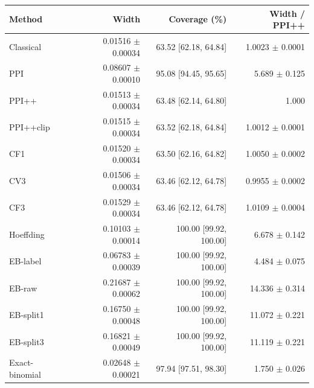 \small
\begin{tabular}{lrrr}
\toprule
Method & Width & Coverage (\%) & Width / PPI++ \\
\midrule
Classical & 0.01516 $\pm$ 0.00034 & 63.52 [62.18, 64.84] & 1.0023 $\pm$ 0.0001 \\
PPI & 0.08607 $\pm$ 0.00010 & 95.08 [94.45, 95.65] & 5.689 $\pm$ 0.125 \\
PPI++ & 0.01513 $\pm$ 0.00034 & 63.48 [62.14, 64.80] & 1.000 \\
PPI++clip & 0.01515 $\pm$ 0.00034 & 63.52 [62.18, 64.84] & 1.0012 $\pm$ 0.0001 \\
CF1 & 0.01520 $\pm$ 0.00034 & 63.50 [62.16, 64.82] & 1.0050 $\pm$ 0.0002 \\
CV3 & 0.01506 $\pm$ 0.00034 & 63.46 [62.12, 64.78] & 0.9955 $\pm$ 0.0002 \\
CF3 & 0.01529 $\pm$ 0.00034 & 63.46 [62.12, 64.78] & 1.0109 $\pm$ 0.0004 \\
Hoeffding & 0.10103 $\pm$ 0.00014 & 100.00 [99.92, 100.00] & 6.678 $\pm$ 0.142 \\
EB-label & 0.06783 $\pm$ 0.00039 & 100.00 [99.92, 100.00] & 4.484 $\pm$ 0.075 \\
EB-raw & 0.21687 $\pm$ 0.00062 & 100.00 [99.92, 100.00] & 14.336 $\pm$ 0.314 \\
EB-split1 & 0.16750 $\pm$ 0.00048 & 100.00 [99.92, 100.00] & 11.072 $\pm$ 0.221 \\
EB-split3 & 0.16821 $\pm$ 0.00049 & 100.00 [99.92, 100.00] & 11.119 $\pm$ 0.221 \\
Exact-binomial & 0.02648 $\pm$ 0.00021 & 97.94 [97.51, 98.30] & 1.750 $\pm$ 0.026 \\
\bottomrule
\end{tabular}
